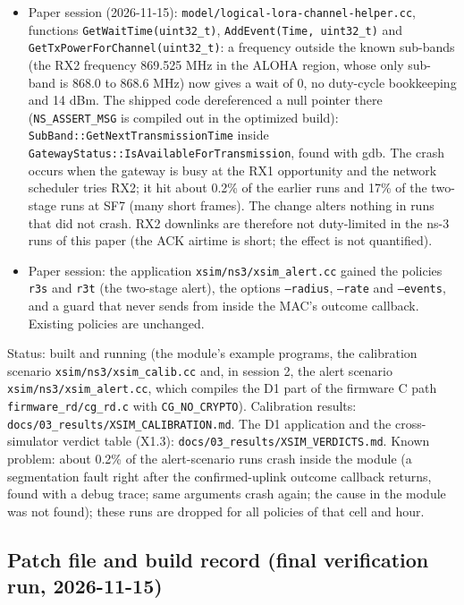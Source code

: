 \begin{itemize}
\item Paper session (2026-11-15): \texttt{model/logical-lora-channel-helper.cc}, functions \texttt{GetWaitTime(uint32\_t)}, \texttt{AddEvent(Time, uint32\_t)} and \texttt{GetTxPowerForChannel(uint32\_t)}: a frequency outside the known sub-bands (the RX2 frequency 869.525 MHz in the ALOHA region, whose only sub-band is 868.0 to 868.6 MHz) now gives a wait of 0, no duty-cycle bookkeeping and 14 dBm. The shipped code dereferenced a null pointer there (\texttt{NS\_ASSERT\_MSG} is compiled out in the optimized build): \texttt{SubBand::GetNextTransmissionTime} inside \texttt{GatewayStatus::IsAvailableForTransmission}, found with gdb. The crash occurs when the gateway is busy at the RX1 opportunity and the network scheduler tries RX2; it hit about 0.2\% of the earlier runs and 17\% of the two-stage runs at SF7 (many short frames). The change alters nothing in runs that did not crash. RX2 downlinks are therefore not duty-limited in the ns-3 runs of this paper (the ACK airtime is short; the effect is not quantified).
\item Paper session: the application \texttt{xsim/ns3/xsim\_alert.cc} gained the policies \texttt{r3s} and \texttt{r3t} (the two-stage alert), the options \texttt{--radius}, \texttt{--rate} and \texttt{--events}, and a guard that never sends from inside the MAC's outcome callback. Existing policies are unchanged.
\end{itemize}

Status: built and running (the module's example programs, the calibration scenario \texttt{xsim/ns3/xsim\_calib.cc} and, in session 2, the alert scenario \texttt{xsim/ns3/xsim\_alert.cc}, which compiles the D1 part of the firmware C path \texttt{firmware\_rd/cg\_rd.c} with \texttt{CG\_NO\_CRYPTO}). Calibration results: \texttt{docs/03\_results/XSIM\_CALIBRATION.md}. The D1 application and the cross-simulator verdict table (X1.3): \texttt{docs/03\_results/XSIM\_VERDICTS.md}. Known problem: about 0.2\% of the alert-scenario runs crash inside the module (a segmentation fault right after the confirmed-uplink outcome callback returns, found with a debug trace; same arguments crash again; the cause in the module was not found); these runs are dropped for all policies of that cell and hour.

\subsection*{Patch file and build record (final verification run, 2026-11-15)}

